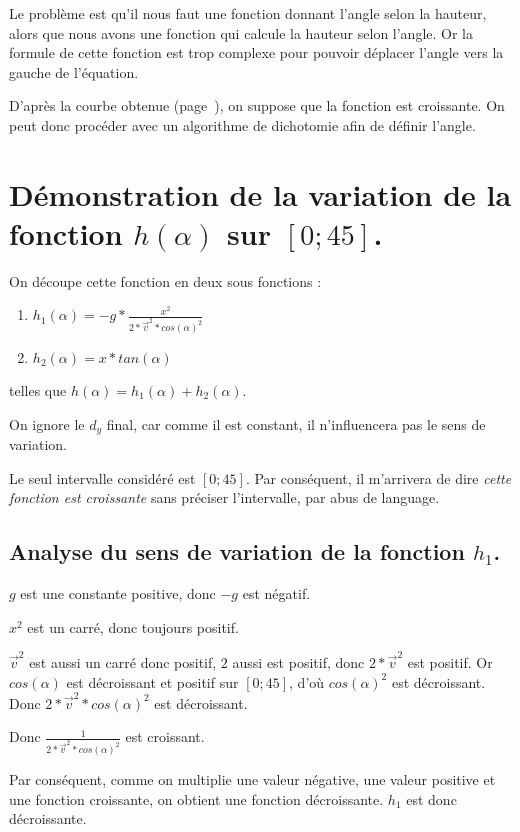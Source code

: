 Le problème est qu'il nous faut une fonction donnant l'angle selon la hauteur, alors que nous avons une fonction qui calcule la hauteur selon l'angle. Or la formule de cette fonction est trop complexe pour pouvoir déplacer l'angle vers la gauche de l'équation.

D'après la courbe obtenue (page~\pageref{crb_angle}), on suppose que la fonction est croissante. On peut donc procéder avec un algorithme de dichotomie afin de définir l'angle.

\newpage
\section{Démonstration de la variation de la fonction $h(\alpha)$ sur $[0;45]$.}
On découpe cette fonction en deux sous fonctions :\begin{enumerate}
	\item $h_1(\alpha) = -g*\frac{x^2}{2*\overrightarrow{v}^2*cos(\alpha)^2}$
	\item $h_2(\alpha) = x * tan(\alpha)$
\end{enumerate}
telles que $h(\alpha) = h_1(\alpha) + h_2(\alpha)$.

On ignore le $d_y$ final, car comme il est constant, il n'influencera pas le sens de variation.

Le seul intervalle considéré est $[0;45]$. Par conséquent, il m'arrivera de dire \emph{cette fonction est croissante} sans préciser l'intervalle, par abus de language.

\subsection{Analyse du sens de variation de la fonction $h_1$.}
$g$ est une constante positive, donc $-g$ est négatif.

$x^2$ est un carré, donc toujours positif.

$\overrightarrow{v}^2$ est aussi un carré donc positif, $2$ aussi est positif, donc $2*\overrightarrow{v}^2$ est positif.
Or $cos(\alpha)$ est décroissant et positif sur $[0;45]$, d'où $cos(\alpha)^2$ est décroissant.
Donc $2*\overrightarrow{v}^2*cos(\alpha)^2$ est décroissant.

Donc $\frac{1}{2*\overrightarrow{v}^2*cos(\alpha)^2}$ est croissant.

Par conséquent, comme on multiplie une valeur négative, une valeur positive et une fonction croissante, on obtient une fonction décroissante. $h_1$ est donc décroissante.

